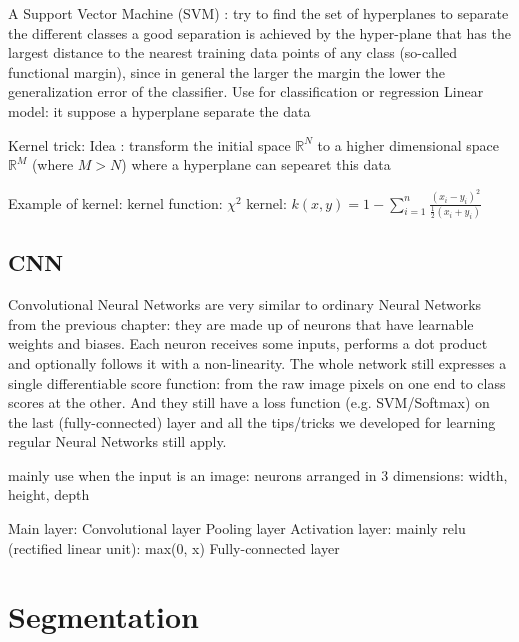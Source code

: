 \documentclass[aspectratio=169]{beamer}
\let\oldsection\section
\renewcommand{\section}[1]{
    \oldsection{#1}	
    \subsection{}
}
\newenvironment{myframe}[1][t]{\begin{frame}[#1]{\secname}{\subsecname}}{\end{frame}}
\begin{document}
    \begin{myframe}
        A Support Vector Machine (SVM) : try to find the set of hyperplanes to separate the different classes
        a good separation is achieved by the hyper-plane that has the largest distance to the nearest training data points of any class (so-called functional margin), since in general the larger the margin the lower the generalization error of the classifier.
        Use for classification or regression
        Linear model: it suppose a hyperplane separate the data
        
        Kernel trick: Idea : transform the initial space $\mathbb{R}^N$ to a higher dimensional space $\mathbb{R}^M$ (where $M > N$) where a hyperplane can sepearet this data
        
        Example of kernel: kernel function: 
        $\chi^2$ kernel: $k(x,y) = 1 - \displaystyle\sum_{i=1}^n \frac{(x_i-y_i)^2}{\frac{1}{2}(x_i+y_i)}$
        
    \end{myframe}
    
    \subsection{CNN}
    
    \begin{myframe}
        Convolutional Neural Networks are very similar to ordinary Neural Networks from the previous chapter: they are made up of neurons that have learnable weights and biases. Each neuron receives some inputs, performs a dot product and optionally follows it with a non-linearity. The whole network still expresses a single differentiable score function: from the raw image pixels on one end to class scores at the other. And they still have a loss function (e.g. SVM/Softmax) on the last (fully-connected) layer and all the tips/tricks we developed for learning regular Neural Networks still apply.
        
        mainly use when the input is an image: neurons arranged in 3 dimensions: width, height, depth
        
        Main layer:
        Convolutional layer
        Pooling layer
        Activation layer: mainly relu (rectified linear unit): max(0, x)
        Fully-connected layer
    \end{myframe}
    
    \section{Segmentation}
    
\end{document}
